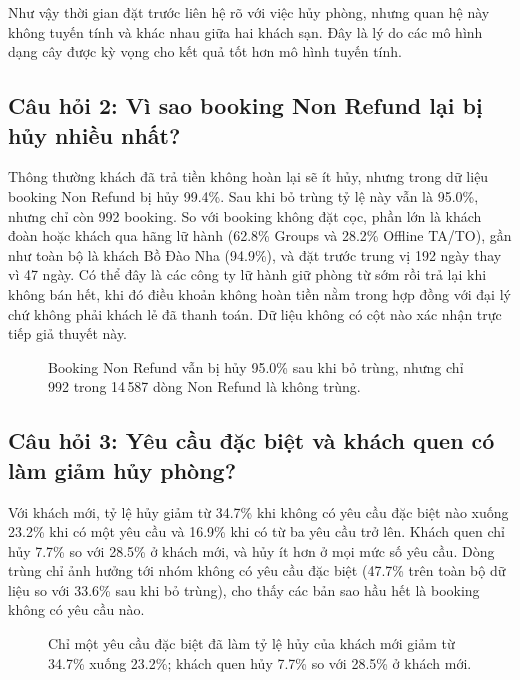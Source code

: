 Như vậy thời gian đặt trước liên hệ rõ với việc hủy phòng, nhưng quan hệ này không tuyến tính và khác nhau giữa hai khách sạn.
Đây là lý do các mô hình dạng cây được kỳ vọng cho kết quả tốt hơn mô hình tuyến tính.

\subsection{Câu hỏi 2: Vì sao booking Non Refund lại bị hủy nhiều nhất?}
Thông thường khách đã trả tiền không hoàn lại sẽ ít hủy, nhưng trong dữ liệu booking Non Refund bị hủy 99.4\%.
Sau khi bỏ trùng tỷ lệ này vẫn là 95.0\%, nhưng chỉ còn 992 booking. So với booking không đặt cọc, phần lớn là khách đoàn
hoặc khách qua hãng lữ hành (62.8\% Groups và 28.2\% Offline TA/TO), gần như toàn bộ là khách Bồ Đào Nha (94.9\%),
và đặt trước trung vị 192 ngày thay vì 47 ngày. Có thể đây là các công ty lữ hành giữ phòng từ sớm rồi trả lại khi không bán hết,
khi đó điều khoản không hoàn tiền nằm trong hợp đồng với đại lý chứ không phải khách lẻ đã thanh toán.
Dữ liệu không có cột nào xác nhận trực tiếp giả thuyết này.

\begin{figure}[H]
\centering
{}
\caption{Booking Non Refund vẫn bị hủy 95.0\% sau khi bỏ trùng, nhưng chỉ 992 trong 14\,587 dòng Non Refund là không trùng.}
\label{fig:tab-q2}
\end{figure}

\subsection{Câu hỏi 3: Yêu cầu đặc biệt và khách quen có làm giảm hủy phòng?}
Với khách mới, tỷ lệ hủy giảm từ 34.7\% khi không có yêu cầu đặc biệt nào xuống 23.2\% khi có một yêu cầu và 16.9\% khi có
từ ba yêu cầu trở lên. Khách quen chỉ hủy 7.7\% so với 28.5\% ở khách mới, và hủy ít hơn ở mọi mức số yêu cầu.
Dòng trùng chỉ ảnh hưởng tới nhóm không có yêu cầu đặc biệt (47.7\% trên toàn bộ dữ liệu so với 33.6\% sau khi bỏ trùng),
cho thấy các bản sao hầu hết là booking không có yêu cầu nào.

\begin{figure}[H]
\centering
{}
\caption{Chỉ một yêu cầu đặc biệt đã làm tỷ lệ hủy của khách mới giảm từ 34.7\% xuống 23.2\%; khách quen hủy 7.7\% so với 28.5\% ở khách mới.}
\label{fig:tab-q3}
\end{figure}

